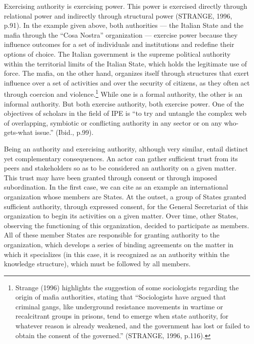 Exercising authority is exercising power. This power is exercised directly through relational power and indirectly through structural power (STRANGE, 1996, p.91). In the example given above, both authorities --- the Italian State and the mafia through the ``Cosa Nostra'' organization --- exercise power because they influence outcomes for a set of individuals and institutions and redefine their options of choice. The Italian government is the supreme political authority within the territorial limits of the Italian State, which holds the legitimate use of force. The mafia, on the other hand, organizes itself through structures that exert influence over a set of activities and over the security of citizens, as they often act through coercion and violence.\footnote{Strange (1996) highlights the suggestion of some sociologists regarding the origin of mafia authorities, stating that ``Sociologists have argued that criminal gangs, like underground resistance movements in wartime or recalcitrant groups in prisons, tend to emerge when state authority, for whatever reason is already weakened, and the government has lost or failed to obtain the consent of the governed.'' (STRANGE, 1996, p.116).} While one is a formal authority, the other is an informal authority. But both exercise authority, both exercise power. One of the objectives of scholars in the field of IPE is ``to try and untangle the complex web of overlapping, symbiotic or conflicting authority in any sector or on any who-gets-what issue.'' (Ibid., p.99).

Being an authority and exercising authority, although very similar, entail distinct yet complementary consequences. An actor can gather sufficient trust from its peers and stakeholders so as to be considered an authority on a given matter. This trust may have been granted through consent or through imposed subordination. In the first case, we can cite as an example an international organization whose members are States. At the outset, a group of States granted sufficient authority, through expressed consent, for the General Secretariat of this organization to begin its activities on a given matter. Over time, other States, observing the functioning of this organization, decided to participate as members. All of these member States are responsible for granting authority to the organization, which develops a series of binding agreements on the matter in which it specializes (in this case, it is recognized as an authority within the knowledge structure), which must be followed by all members.

